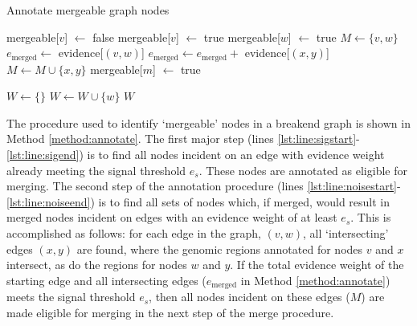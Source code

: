 \documentclass{article}
\begin{document}
\begin{algorithm}[t!]
\caption{Annotate mergeable graph nodes}
\label{method:annotate}
\begin{algorithmic}[1]
 \label{lst:line:clear}
\State mergeable[$v$] $\gets$ false
\EndFor
{}  \label{lst:line:sigstart}
\State mergeable[$v$] $\gets$ true
\State mergeable[$w$] $\gets$ true   \label{lst:line:sigend}
\EndIf
\EndFor
\EndFor
{} \label{lst:line:noisestart}
\State $M \gets \{v,w\}$
\State $e_{\text{merged}} \gets $ evidence[$(v,w)$]
\State $e_{\text{merged}} \gets e_{\text{merged}} +$ evidence[$(x,y)$]
\State $M \gets M \cup \{x,y\}$
\EndIf
\EndFor
\EndFor
{}
\State mergeable[$m$] $\gets$ true \label{lst:line:noiseend}
\EndFor
\EndIf
\EndFor
\EndFor
\EndProcedure
\Statex

\State $W \gets \{\}$
\State $W \gets W \cup \{w\}$
\EndIf
\EndFor
\State \Return $W$
\EndProcedure

\end{algorithmic}
\end{algorithm}


The procedure used to identify `mergeable' nodes in a breakend graph is shown in Method \ref{method:annotate}. The first major step (lines \ref{lst:line:sigstart}-\ref{lst:line:sigend}) is to find all nodes incident on an edge with evidence weight already meeting the signal threshold $e_s$. These nodes are annotated as eligible for merging. The second step of the annotation procedure (lines \ref{lst:line:noisestart}-\ref{lst:line:noiseend}) is to find all sets of nodes which, if merged, would result in merged nodes incident on edges with an evidence weight of at least $e_s$. This is accomplished as follows: for each edge in the graph, $(v,w)$, all `intersecting' edges $(x,y)$ are found, where the genomic regions annotated for nodes $v$ and $x$ intersect, as do the regions for nodes $w$ and $y$. If the total evidence weight of the starting edge and all intersecting edges ($e_{\text{merged}}$ in Method \ref{method:annotate}) meets the signal threshold $e_s$, then all nodes incident on these edges ($M$) are made eligible for merging in the next step of the merge procedure.
\end{document}
